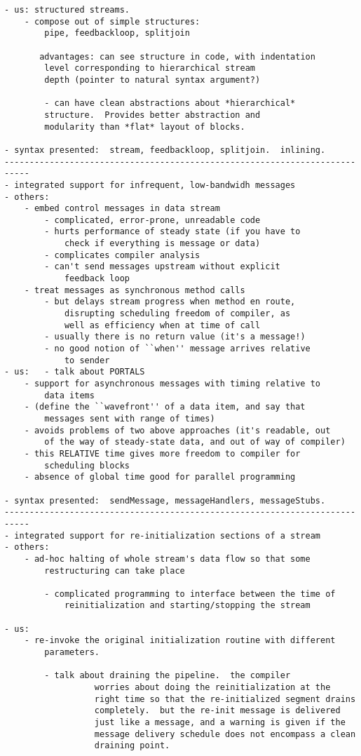 \begin{verbatim}
- us: structured streams.
	- compose out of simple structures:  
		pipe, feedbackloop, splitjoin

	   advantages: can see structure in code, with indentation
		level corresponding to hierarchical stream
		depth (pointer to natural syntax argument?)

		- can have clean abstractions about *hierarchical*
		structure.  Provides better abstraction and
		modularity than *flat* layout of blocks.

- syntax presented:  stream, feedbackloop, splitjoin.  inlining.
---------------------------------------------------------------------------
- integrated support for infrequent, low-bandwidh messages
- others:
	- embed control messages in data stream
		- complicated, error-prone, unreadable code
		- hurts performance of steady state (if you have to 
			check if everything is message or data)
		- complicates compiler analysis
		- can't send messages upstream without explicit
			feedback loop
	- treat messages as synchronous method calls
		- but delays stream progress when method en route, 
			disrupting scheduling freedom of compiler, as
			well as efficiency when at time of call
		- usually there is no return value (it's a message!)
		- no good notion of ``when'' message arrives relative
			to sender
- us: 	- talk about PORTALS
	- support for asynchronous messages with timing relative to
		data items
	- (define the ``wavefront'' of a data item, and say that
		messages sent with range of times)
	- avoids problems of two above approaches (it's readable, out
		of the way of steady-state data, and out of way of compiler)
	- this RELATIVE time gives more freedom to compiler for
		scheduling blocks
	- absence of global time good for parallel programming

- syntax presented:  sendMessage, messageHandlers, messageStubs.
---------------------------------------------------------------------------
- integrated support for re-initialization sections of a stream
- others:	
	- ad-hoc halting of whole stream's data flow so that some
		restructuring can take place
		
		- complicated programming to interface between the time of
			reinitialization and starting/stopping the stream

- us:
	- re-invoke the original initialization routine with different 
		parameters.

		- talk about draining the pipeline.  the compiler
                  worries about doing the reinitialization at the
                  right time so that the re-initialized segment drains
                  completely.  but the re-init message is delivered
                  just like a message, and a warning is given if the
                  message delivery schedule does not encompass a clean
                  draining point.


\end{verbatim}
